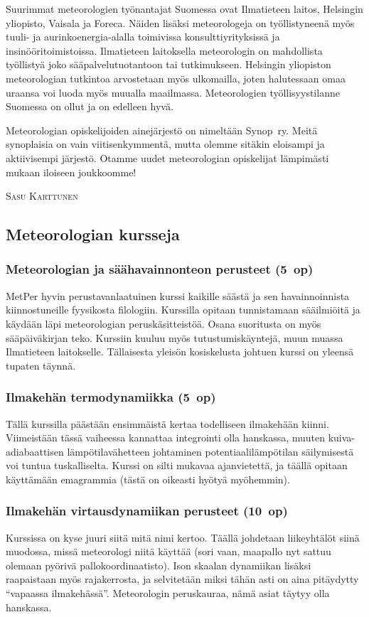 \documentclass[../ala_hataile.tex]{subfiles}
\begin{document}
Suurimmat meteorologien työn\-antajat Suomessa ovat Ilma\-tieteen laitos, Helsingin yliopisto, Vaisala ja Foreca. Näiden lisäksi meteorologeja on työllistyneenä myös tuuli- ja aurinko\-energia-alalla toimivissa konsultti\-yrityksissä ja insinööri\-toimistoissa. Ilmatieteen laitoksella meteorologin on mahdollista työllistyä joko sää\-palvelu\-tuotantoon tai tutkimukseen. Helsingin yliopiston meteorologian tutkintoa arvostetaan myös ulkomailla, joten halutessaan omaa uraansa voi luoda myös muualla maailmassa. Meteorologien työllisyystilanne Suomessa on ollut ja on edelleen hyvä.

Meteorologian opiskelijoiden ainejärjestö on nimeltään Synop~ry. Meitä synoplaisia on vain viitisenkymmentä, mutta olemme sitäkin eloisampi ja aktiivisempi järjestö. Otamme uudet meteorologian opiskelijat lämpimästi mukaan iloiseen joukkoomme!

\vspace{0.5cm}
\noindent\textsc{Sasu Karttunen}
\vspace{1cm}

\subsection*{Meteorologian kursseja}
\subsubsection*{Meteorologian ja säähavainnonteon perusteet (5~op)}
MetPer hyvin perustavanlaatuinen kurssi kaikille
säästä ja sen havainnoinnista kiinnostuneille
fyysikosta filologiin. Kurssilla opitaan
tunnistamaan sääilmiöitä ja käydään
läpi meteorologian peruskäsitteistöä. Osana
suoritusta on myös sääpäiväkirjan teko.
Kurssiin kuuluu myös tutustumiskäyntejä,
muun muassa Ilmatieteen laitokselle. Tällaisesta
yleisön kosiskelusta johtuen kurssi
on yleensä tupaten täynnä.
\subsubsection*{Ilmakehän termodynamiikka (5~op)}
Tällä kurssilla päästään ensimmäistä
kertaa todelliseen ilmakehään kiinni. Viimeistään
tässä vaiheessa kannattaa integrointi
olla hanskassa, muuten kuiva-adiabaattisen
lämpötilavähetteen johtaminen
potentiaalilämpötilan säilymisestä voi tuntua
tuskalliselta. Kurssi on silti mukavaa
ajanvietettä, ja täällä opitaan käyttämään
emagrammia (tästä on oikeasti hyötyä
myöhemmin).
\subsubsection*{Ilmakehän virtausdynamiikan perusteet (10~op)}
Kurssissa on kyse juuri siitä mitä nimi
kertoo. Täällä johdetaan liikeyhtälöt siinä
muodossa, missä meteorologi niitä käyttää
(sori vaan, maapallo nyt sattuu olemaan
pyörivä pallokoordinaatisto). Ison skaalan
dynamiikan lisäksi raapaistaan myös rajakerrosta,
ja selvitetään miksi tähän asti on
aina pitäydytty ``vapaassa ilmakehässä''.
Meteorologin peruskauraa, nämä asiat täytyy
olla hanskassa.
\end{document}
